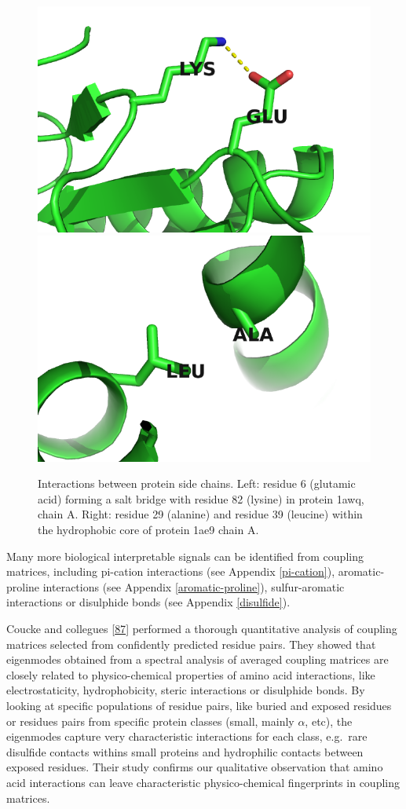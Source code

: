 \documentclass[12pt,a4paper,twoside]{book}
\theoremstyle{definition}
\theoremstyle{definition}
\theoremstyle{remark}
\begin{document}
\begin{figure}
\includegraphics[width=0.5\linewidth]{img/coupling_matrix_analysis/1a9xA05_6_82} \includegraphics[width=0.5\linewidth]{img/coupling_matrix_analysis/1ae9A00_29_39} \caption{Interactions between protein side
chains. Left: residue 6 (glutamic acid) forming a salt bridge with
residue 82 (lysine) in protein 1awq, chain A. Right: residue 29
(alanine) and residue 39 (leucine) within the hydrophobic core of
protein 1ae9 chain A.}\label{fig:coupling-matrix-pymol}
\end{figure}

Many more biological interpretable signals can be identified from
coupling matrices, including pi-cation interactions (see Appendix
\ref{pi-cation}), aromatic-proline interactions (see Appendix
\ref{aromatic-proline}), sulfur-aromatic interactions or disulphide
bonds (see Appendix \ref{disulfide}).

Coucke and collegues {[}\protect\hyperlink{ref-Coucke2016}{87}{]}
performed a thorough quantitative analysis of coupling matrices selected
from confidently predicted residue pairs. They showed that eigenmodes
obtained from a spectral analysis of averaged coupling matrices are
closely related to physico-chemical properties of amino acid
interactions, like electrostaticity, hydrophobicity, steric interactions
or disulphide bonds. By looking at specific populations of residue
pairs, like buried and exposed residues or residues pairs from specific
protein classes (small, mainly \(\alpha\), etc), the eigenmodes capture
very characteristic interactions for each class, e.g.~rare disulfide
contacts withins small proteins and hydrophilic contacts between exposed
residues. Their study confirms our qualitative observation that amino
acid interactions can leave characteristic physico-chemical fingerprints
in coupling matrices.
\end{document}
